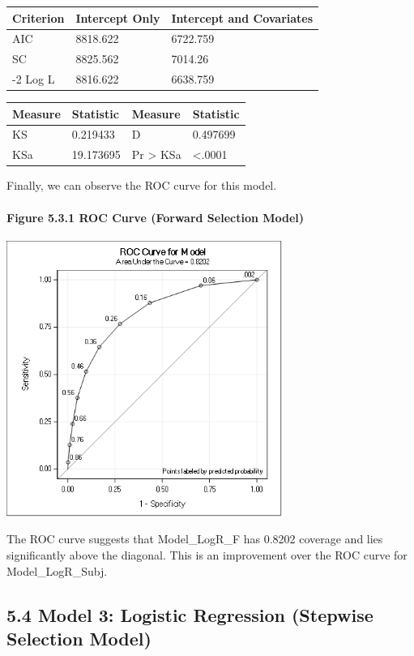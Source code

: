 \documentclass[]{article}
\let\oldparagraph\paragraph
\renewcommand{\paragraph}[1]{\oldparagraph{#1}\mbox{}}
\begin{document}
\begin{longtable}[]{@{}lll@{}}
\toprule
Criterion & Intercept Only & Intercept and Covariates\tabularnewline
\midrule
\endhead
AIC & 8818.622 & 6722.759\tabularnewline
SC & 8825.562 & 7014.26\tabularnewline
-2 Log L & 8816.622 & 6638.759\tabularnewline
\bottomrule
\end{longtable}

\begin{longtable}[]{@{}llll@{}}
\toprule
Measure & Statistic & Measure & Statistic\tabularnewline
\midrule
\endhead
KS & 0.219433 & D & 0.497699\tabularnewline
KSa & 19.173695 & Pr \textgreater{} KSa &
\textless{}.0001\tabularnewline
\bottomrule
\end{longtable}

Finally, we can observe the ROC curve for this model.

\newpage

\paragraph{Figure 5.3.1 ROC Curve (Forward Selection
Model)}\label{figure-5.3.1-roc-curve-forward-selection-model}

\includegraphics[height=3.54167in]{images/roc_f.png}

The ROC curve suggests that Model\_LogR\_F has 0.8202 coverage and lies
significantly above the diagonal. This is an improvement over the ROC
curve for Model\_LogR\_Subj.

\subsection{5.4 Model 3: Logistic Regression (Stepwise Selection
Model)}\label{model-3-logistic-regression-stepwise-selection-model}
\end{document}
